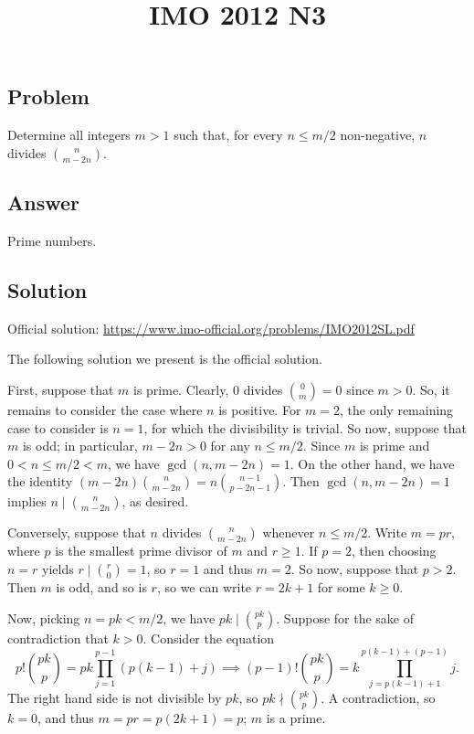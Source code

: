 \documentclass{article}
\title{IMO 2012 N3}
\author{}
\date{}
\begin{document}
\maketitle



\subsection*{Problem}

Determine all integers $m > 1$ such that, for every $n \leq m/2$ non-negative, $n$ divides ${n \choose m - 2n}$.



\subsection*{Answer}

Prime numbers.



\subsection*{Solution}

Official solution: \url{https://www.imo-official.org/problems/IMO2012SL.pdf}

The following solution we present is the official solution.

First, suppose that $m$ is prime.
Clearly, $0$ divides ${0 \choose m} = 0$ since $m > 0$.
So, it remains to consider the case where $n$ is positive.
For $m = 2$, the only remaining case to consider is $n = 1$, for which the divisibility is trivial.
So now, suppose that $m$ is odd; in particular, $m - 2n > 0$ for any $n \leq m/2$.
Since $m$ is prime and $0 < n \leq m/2 < m$, we have $\gcd(n, m - 2n) = 1$.
On the other hand, we have the identity $(m - 2n) {n \choose m - 2n} = n {n - 1 \choose p - 2n - 1}$.
Then $\gcd(n, m - 2n) = 1$ implies $n \mid {n \choose m - 2n}$, as desired.

Conversely, suppose that $n$ divides ${n \choose m - 2n}$ whenever $n \leq m/2$.
Write $m = pr$, where $p$ is the smallest prime divisor of $m$ and $r \geq 1$.
If $p = 2$, then choosing $n = r$ yields $r \mid {r \choose 0} = 1$, so $r = 1$ and thus $m = 2$.
So now, suppose that $p > 2$.
Then $m$ is odd, and so is $r$, so we can write $r = 2k + 1$ for some $k \geq 0$.

Now, picking $n = pk < m/2$, we have $pk \mid {pk \choose p}$.
Suppose for the sake of contradiction that $k > 0$.
Consider the equation
\[ p! {pk \choose p} = pk \prod_{j = 1}^{p - 1} (p(k - 1) + j) \implies (p - 1)! {pk \choose p} = k \prod_{j = p(k - 1) + 1}^{p(k - 1) + (p - 1)} j. \]
The right hand side is not divisible by $pk$, so $pk \nmid {pk \choose p}$.
A contradiction, so $k = 0$, and thus $m = pr = p(2k + 1) = p$; $m$ is a prime.
\end{document}
